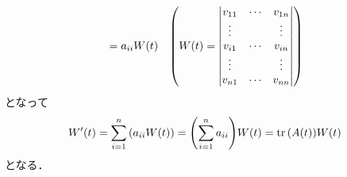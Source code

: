 \documentclass[autodetect-engine,dvipdfmx-if-dvi,ja=standard]{bxjsarticle}
\makeatletter
\theoremstyle{mystyle1}
\theoremstyle{mystyle2}
\renewenvironment{proof}[1][\proofname]{\par
  \pushQED{\qed}%
  \normalfont
  \topsep6\p@\@plus6\p@ \trivlist
  \item[\hskip\labelsep{\bfseries\sffamily #1}]\ignorespaces
}{%
  \popQED\endtrivlist\@endpefalse
}
\renewcommand\proofname{\ensuremath{\because}}
\makeatother
\begin{document}
\begin{proof}
\begin{align*}
                                     & =a_{ii}W\qty(t)
                                     & \qty(W\qty(t)=
    \mdet{
    v_{11}                           & \cdots          & v_{1n}                           \\
    \vdots                           &                 & \vdots                           \\
    v_{i1}                           & \cdots          & v_{in}                           \\
    \vdots                           &                 & \vdots                           \\
    v_{n1}                           & \cdots          & v_{nn}
    })
  \end{align*}
  となって
  \[W^\prime\qty(t)=\sum_{i=1}^n\qty(a_{ii}W\qty(t))=\qty(\sum_{i=1}^na_{ii})W\qty(t)=\tr \qty(A\qty(t))W\qty(t)\]
  となる．
\end{proof}
\end{document}
